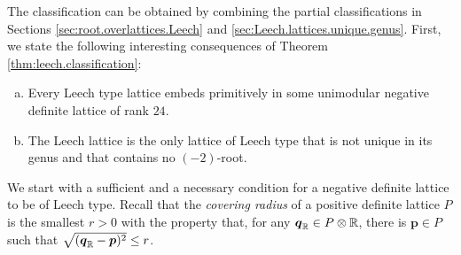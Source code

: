 \documentclass[11pt,letterpaper]{amsart}
\newcommand{\vect}[1]{\boldsymbol{#1}}
\begin{document}
The classification can be obtained by combining the partial classifications in Sections \ref{sec:root.overlattices.Leech} and \ref{sec:Leech.lattices.unique.genus}.
First, we state the following interesting consequences of Theorem \ref{thm:leech.classification}:

\begin{corollary}
\begin{enumerate}[(a)]
    \item Every Leech type lattice embeds primitively in some unimodular negative definite lattice of rank $24$.
    \item The Leech lattice is the only lattice of Leech type that is not unique in its genus and that contains no $(-2)$-root.
\end{enumerate}
\end{corollary}

We start with a sufficient and a necessary condition for a negative definite lattice to be of Leech type. Recall that the \emph{covering radius} of a positive definite lattice $P$ is the smallest $r>0$ with the property that, for any $\vect{q}_\RR\in P\otimes \RR$, there is $\vect{p}\in P$ such that $\sqrt{(\vect{q}_\RR-\vect{p})^2} \le r$.
\end{document}
